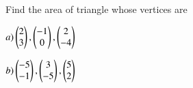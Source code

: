 Find the area of triangle whose vertices are 

$a)\myvec{2\\3}, \myvec{-1\\0}, \myvec{2\\-4}$

$b)\myvec{-5\\-1}, \myvec{3\\-5}, \myvec{5\\2}$
